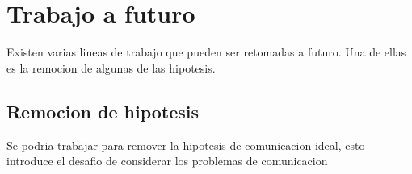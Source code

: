 









\section{Trabajo a futuro}

Existen varias lineas de trabajo que pueden ser retomadas a futuro. Una de
ellas es la remocion de algunas de las hipotesis.

\subsection{Remocion de hipotesis}

Se podria trabajar para remover la hipotesis de comunicacion ideal, esto introduce el desafio de considerar los problemas de comunicacion

